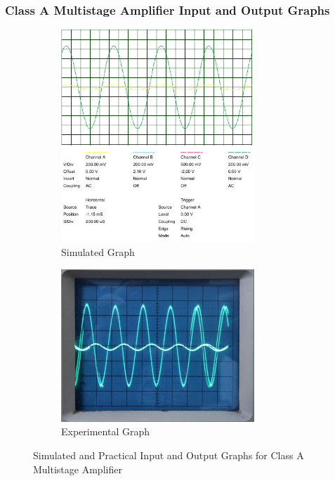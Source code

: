 \documentclass[12pt]{article}
\begin{document}
\subsubsection{Class A Multistage Amplifier Input and Output Graphs}
\begin{figure}[h!]
    \centering
    \begin{subfigure}{0.45\textwidth}
        \includegraphics[width=0.8\textwidth]{Class_A_Graph.png}
        \caption{Simulated Graph}
    \end{subfigure}
    \begin{subfigure}{0.45\textwidth}
        \includegraphics[width=0.8\textwidth]{Class_A_Practical.jpg}
        \caption{Experimental Graph}
    \end{subfigure}
    \caption{Simulated and Practical Input and Output Graphs for Class A Multistage Amplifier}
\end{figure}
\end{document}

